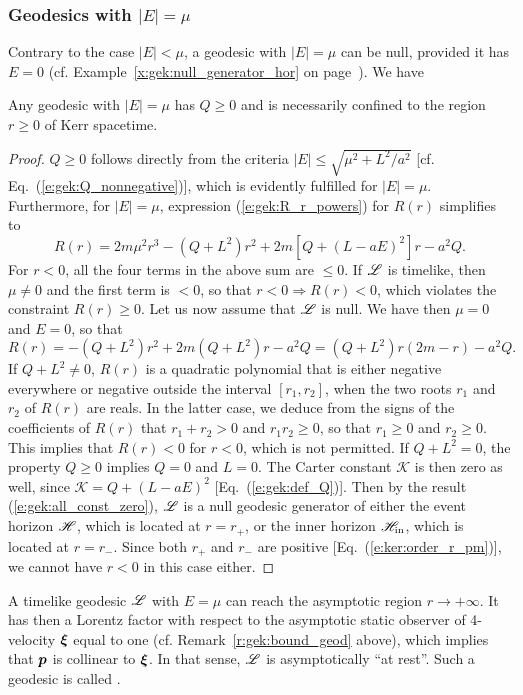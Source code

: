 \subsubsection{Geodesics with $|E|=\mu$}

Contrary to the case $|E|<\mu$, a geodesic with $|E|=\mu$ can be null,
provided it has $E=0$
(cf. Example~\ref{x:gek:null_generator_hor} on page~\pageref{x:gek:null_generator_hor}).
We have
\begin{greybox}
Any geodesic with $|E|=\mu$ has $Q\geq 0$ and is necessarily confined
to the region $r\geq 0$ of Kerr spacetime.
\end{greybox}
\begin{proof}
$Q\geq 0$ follows directly from the criteria $|E| \leq \sqrt{\mu^2 + {L^2}/{a^2}}$
[cf. Eq.~(\ref{e:gek:Q_nonnegative})],
which is evidently fulfilled for $|E|=\mu$.
Furthermore, for $|E|=\mu$, expression (\ref{e:gek:R_r_powers}) for $R(r)$
simplifies to
\[
    R(r) =  2 m \mu^2 r^3 - (Q + L^2) r^2 + 2m  \left[Q + (L-aE)^2 \right] r - a^2 Q .
\]
For $r<0$, all the four terms in the above sum are $\leq 0$.
If $\mathscr{L}$ is timelike, then $\mu\neq 0$ and the first term is $<0$, so that
$r<0 \Longrightarrow R(r) < 0$, which violates the constraint
$R(r) \geq 0$. Let us now assume that $\mathscr{L}$ is null.
We have then $\mu=0$ and $E=0$, so that
\[
    R(r) = - (Q + L^2) r^2 + 2m  (Q + L^2) r -a^2 Q = (Q+L^2) r ( 2m - r) -a^2 Q.
\]
If $Q + L^2 \neq 0$, $R(r)$ is a quadratic polynomial that is
either negative everywhere or negative outside the interval $[r_1, r_2]$,
when the two roots $r_1$ and $r_2$ of $R(r)$ are reals. In the latter case, we deduce
from the signs of the coefficients of $R(r)$ that $r_1+r_2 > 0$ and $r_1 r_2 \geq 0$,
so that $r_1 \geq 0$ and $r_2 \geq 0$. This implies that $R(r) < 0$ for
$r<0$, which is not permitted.
If $Q + L^2 = 0$, the property $Q\geq 0$ implies $Q=0$ and $L = 0$.
The Carter constant $\mathscr{K}$ is then zero as well, since
$\mathscr{K} = Q + (L - a E)^2$ [Eq.~(\ref{e:gek:def_Q})].
Then by the result (\ref{e:gek:all_const_zero}), $\mathscr{L}$ is a null geodesic
generator of either the event horizon $\mathscr{H}$, which is located at $r=r_+$,
or the inner horizon $\mathscr{H}_{\rm in}$, which is located at $r=r_-$.
Since both $r_+$ and $r_-$ are positive
[Eq.~(\ref{e:ker:order_r_pm})], we cannot have $r<0$ in this case either.
\end{proof}

A timelike geodesic $\mathscr{L}$ with $E=\mu$ can reach the asymptotic region
$r\to +\infty$. It has then a Lorentz factor
with respect to the asymptotic static observer of 4-velocity $\bm{\xi}$
equal to one (cf. Remark~\ref{r:gek:bound_geod} above), which implies that
$\bm{p}$ is collinear to $\bm{\xi}$. In that sense, $\mathscr{L}$
is asymptotically ``at rest''. Such a geodesic is called
.


